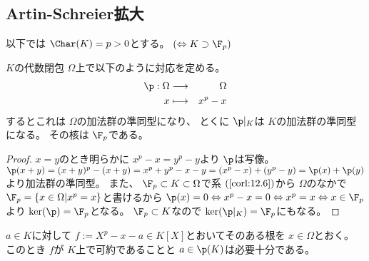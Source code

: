 \documentclass[../master_galois_theory]{subfiles}
\begin{document}
\subsection{Artin-Schreier拡大}

以下では
$\Char(K) = p > 0$とする。 $(\Leftrightarrow K \supset \F_p)$

\begin{prop}
  $K$の代数閉包 $\Omega$上で以下のように対応を定める。
  \begin{eqnarray*}
    \p : \Omega & \longrightarrow & \Omega \\
    x & \longmapsto & x^p - x
  \end{eqnarray*}
  するとこれは $\Omega$の加法群の準同型になり、
  とくに $\p|_K$は $K$の加法群の準同型になる。
  その核は $\F_p$である。
\end{prop}

\begin{proof}
  $x = y$のとき明らかに $x^p - x = y^p - y$より $\p$は写像。
  $\p(x + y) = (x + y)^p - (x + y) = x^p + y^p -x -y = (x^p - x) + (y^p - y) = \p(x) + \p(y)$より加法群の準同型。
  また、 $\F_p \subset K \subset \Omega$で系 $(\mathrm{\ref{corl:12.6}})$から
  $\Omega$のなかで $\F_p = \{ x \in \Omega | x^p = x \}$と書けるから
  $\p(x) = 0 \Leftrightarrow x^p - x = 0 \Leftrightarrow x^p = x \Leftrightarrow x \in \F_p$より $\ker(\p) = \F_p$となる。
  $\F_p \subset K$なので $\ker(\p|_K) = \F_p$にもなる。
\end{proof}

\begin{lemm} \label{lemm:reducibleartinshreier}
  $a \in K$に対して
  $f := X^p - x - a \in K[X]$とおいてそのある根を $x \in \Omega$とおく。
  このとき $f$が $K$上で可約であることと $a \in \p(K)$は必要十分である。
\end{lemm}
\end{document}
